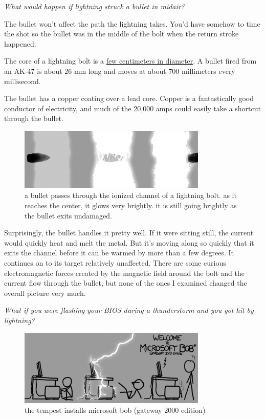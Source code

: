 { \emph{What would happen if lightning struck a bullet in midair?} }

{The bullet won't affect the path the lightning takes. You'd have somehow to time the shot so the bullet was in the middle of the bolt when the return stroke happened.}

{The core of a lightning bolt is a \href{http://www.agu.org/pubs/crossref/1968/JB073i006p01889.shtml}{few centimeters in diameter}. A bullet fired from an AK-47 is about 26 mm long and moves at about 700 millimeters every millisecond.}

{The bullet has a copper coating over a lead core. Copper is a fantastically good conductor of electricity, and much of the 20,000 amps could easily take a shortcut through the bullet.}

\begin{figure}[!htbp]
\centering
\includegraphics[scale=0.5, max width=0.8\textwidth]{imgs/a/16/lightning_bullet.png}
\caption{a bullet passes through the ionized channel of a lightning bolt. as it reaches the center, it glows very brightly. it is still going brightly as the bullet exits undamaged.}
\end{figure}

{Surprisingly, the bullet handles it pretty well. If it were sitting still, the current would quickly heat and melt the metal. But it’s moving along so quickly that it exits the channel before it can be warmed by more than a few degrees. It continues on to its target relatively unaffected. There are some curious electromagnetic forces created by the magnetic field around the bolt and the current flow through the bullet, but none of the ones I examined changed the overall picture very much.}

{ \emph{What if you were flashing your BIOS during a thunderstorm and you got hit by lightning?} }

\begin{figure}[!htbp]
\centering
\includegraphics[scale=0.5, max width=0.8\textwidth]{imgs/a/16/lightning_bios.png}
\caption{the tempest installs microsoft bob (gateway 2000 edition)}
\end{figure}


